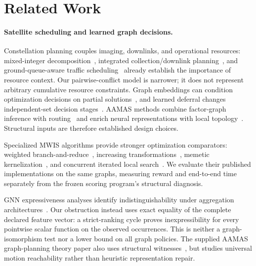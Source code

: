 \section{Related Work}
\label{sec:related}

\paragraph{Satellite scheduling and learned graph decisions.}
Constellation planning couples imaging, downlinks, and operational resources:
mixed-integer decomposition~\cite{augenstein2016optimal}, integrated
collection/downlink planning~\cite{levinson2025optimal}, and ground-queue-aware
traffic scheduling~\cite{tao2023transmitting} already establish the importance
of resource context. Our pairwise-conflict model is narrower; it does not
represent arbitrary cumulative resource constraints. Graph embeddings can
condition optimization decisions on partial solutions~\cite{khalil2017learning},
and learned deferral changes independent-set decision stages~\cite{ahn2020defer}.
AAMAS methods combine factor-graph inference with routing~\cite{li2024factor}
and enrich neural representations with local topology~\cite{bai2025local}.
Structural inputs are therefore established design choices.

Specialized MWIS algorithms provide stronger optimization comparators:
weighted branch-and-reduce~\cite{lamm2019weighted}, increasing
transformations~\cite{gellner2021struction}, memetic
kernelization~\cite{grossmann2024mmwis}, and concurrent iterated local
search~\cite{grossmann2025chils}. We evaluate their published implementations
on the same graphs, measuring reward and end-to-end time separately from
the frozen scoring program's structural diagnosis.

GNN expressiveness analyses identify indistinguishability under aggregation
architectures~\cite{xu2019powerful,morris2019weisfeiler}. Our obstruction instead
uses exact equality of the complete declared feature vector: a strict-ranking
cycle proves inexpressibility for every pointwise scalar function on the
observed occurrences. This is neither a graph-isomorphism test nor a lower
bound on all graph policies. The supplied AAMAS graph-planning theory paper
also uses structural witnesses~\cite{dhar2026universal}, but studies universal
motion reachability rather than heuristic representation repair.

